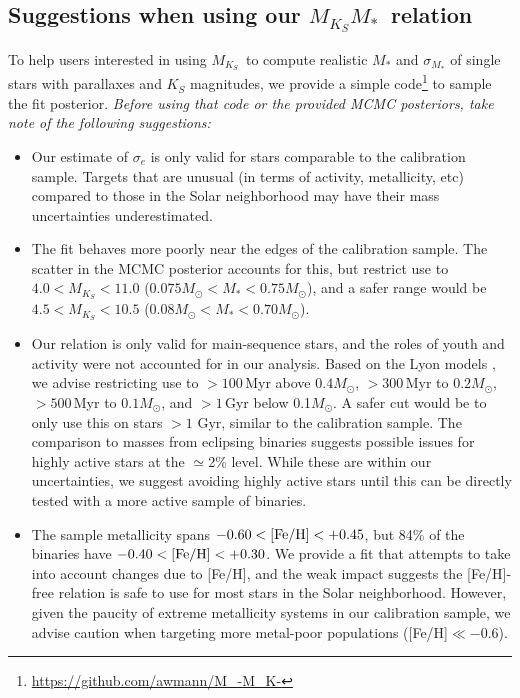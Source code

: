 \documentclass[twocolumn]{aastex62}
\newcommand{\mks}{$M_{K_S}$}
\newcommand{\mmk}{$M_{K_S}$\textendash$M_*$}
\begin{document}
\subsection{Suggestions when using our \mmk\ relation}\label{sec:caveats}

To help users interested in using \mks\ to compute realistic $M_*$ and $\sigma_{M_*}$ of single stars with parallaxes and $K_S$ magnitudes, we provide a simple code\footnote{\href{https://github.com/awmann/M_-M_K-}{https://github.com/awmann/M\_-M\_K-}} to sample the fit posterior. {\it Before using that code or the provided MCMC posteriors, take note of the following suggestions:}
\begin{itemize}

\item Our estimate of $\sigma_e$ is only valid for stars comparable to the calibration sample. Targets that are unusual (in terms of activity, metallicity, etc) compared to those in the Solar neighborhood may have their mass uncertainties underestimated.

\item The fit behaves more poorly near the edges of the calibration sample. The scatter in the MCMC posterior accounts for this, but restrict use to $4.0<M_{K_S}<11.0$ ($0.075M_\odot<M_*<0.75M_\odot$), and a safer range would be $4.5<M_{K_S}<10.5$ ($0.08M_\odot<M_*<0.70M_\odot$). 

\item Our relation is only valid for main-sequence stars, and the roles of youth and activity were not accounted for in our analysis. Based on the Lyon models \citep{BHAC15}, we advise restricting use to $>100$\,Myr above $0.4M_\odot$, $>300$\,Myr to $0.2M_\odot$, $>500$\,Myr to $0.1M_\odot$, and $>1$\,Gyr below 0.1$M_\odot$. A safer cut would be to only use this on stars $>1$ Gyr, similar to the calibration sample. The comparison to masses from eclipsing binaries suggests possible issues for highly active stars at the $\simeq$2\% level. While these are within our uncertainties, we suggest avoiding highly active stars until this can be directly tested with a more active sample of binaries.

\item The sample metallicity spans $-0.60<\rm{[Fe/H]}<+0.45$, but 84\% of the binaries have $-0.40<\rm{[Fe/H]}<+0.30$. We provide a fit that attempts to take into account changes due to [Fe/H], and the weak impact suggests the [Fe/H]-free relation is safe to use for most stars in the Solar neighborhood. However, given the paucity of extreme metallicity systems in our calibration sample, we advise caution when targeting more metal-poor populations ([Fe/H]$\ll-0.6$).


\end{itemize}
\end{document}
